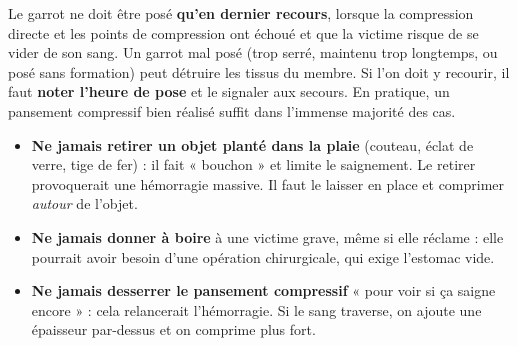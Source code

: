 \documentclass[11pt]{article}
\begin{document}
\begin{attention}
Le garrot ne doit être posé \textbf{qu'en dernier recours}, lorsque la compression directe et les points de compression ont échoué et que la victime risque de se vider de son sang. Un garrot mal posé (trop serré, maintenu trop longtemps, ou posé sans formation) peut détruire les tissus du membre. Si l'on doit y recourir, il faut \textbf{noter l'heure de pose} et le signaler aux secours. En pratique, un pansement compressif bien réalisé suffit dans l'immense majorité des cas.
\end{attention}

\begin{attention}
\begin{itemize}
\item \textbf{Ne jamais retirer un objet planté dans la plaie} (couteau, éclat de verre, tige de fer) : il fait « bouchon » et limite le saignement. Le retirer provoquerait une hémorragie massive. Il faut le laisser en place et comprimer \emph{autour} de l'objet.
\item \textbf{Ne jamais donner à boire} à une victime grave, même si elle réclame : elle pourrait avoir besoin d'une opération chirurgicale, qui exige l'estomac vide.
\item \textbf{Ne jamais desserrer le pansement compressif} « pour voir si ça saigne encore » : cela relancerait l'hémorragie. Si le sang traverse, on ajoute une épaisseur par-dessus et on comprime plus fort.
\end{itemize}
\end{attention}
\end{document}
